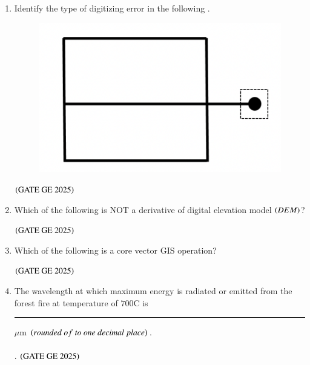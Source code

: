\documentclass[journal,12pt,onecolumn]{IEEEtran}
\theoremstyle{remark}
\begin{document}
\begin{enumerate}
\begin{enumerate}
\begin{multicols}{4}
\end{multicols}
\end{enumerate}
\hfill $\brak{\text{GATE GE 2025}}$
\bigskip
\item Identify the type of digitizing error in the following .
\\
\begin{figure}[H]
    \centering
    \includegraphics[width=0.25\columnwidth]{figs/fig4.png}
    \caption{}
    \label{figs:fig4}
\end{figure}

\begin{enumerate}
\end{enumerate}
\hfill $\brak{\text{GATE GE 2025}}$
\bigskip
\item Which of the following is NOT a derivative of digital elevation model $\left(DEM\right)$?
\begin{enumerate}
\end{enumerate}
\hfill $\brak{\text{GATE GE 2025}}$
\bigskip
\item Which of the following is a core vector GIS operation?
\begin{enumerate}
\end{enumerate}
\hfill $\brak{\text{GATE GE 2025}}$
\bigskip
\item The wavelength at which maximum energy is radiated or emitted from the forest fire at temperature of $700$\degree C is \rule{2cm}{0.5mm} $\mu$m $\brak{rounded\ of\ to\ one\ decimal\ place}$.
\\
\\.
\hfill $\brak{\text{GATE GE 2025}}$
\bigskip


\end{enumerate}
\end{document}
